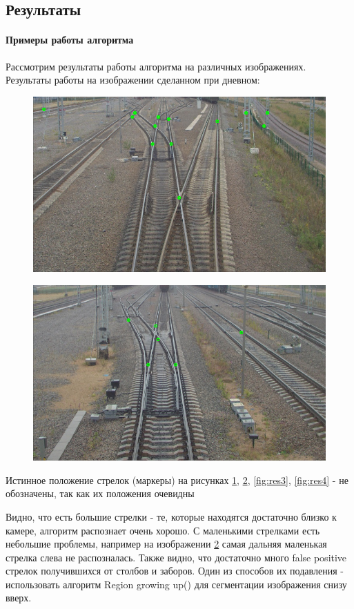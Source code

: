 \newpage
\subsection{Результаты}
\paragraph{Примеры работы алгоритма}
Рассмотрим результаты работы алгоритма на различных изображениях.
\newline
Результаты работы на изображении сделанном при дневном:
\begin{figure}[!h]
	\centering
	\includegraphics[width=0.7\linewidth]{pictures/screenshot0015}
	\caption{}
	\label{fig:res1}
\end{figure}
\begin{figure}[!h]
	\centering
	\includegraphics[width=0.7\linewidth]{pictures/screenshot0016}
	\caption{}
	\label{fig:res2}
\end{figure}
\newpage

Истинное положение стрелок (маркеры) на рисунках \ref{fig:res1}, \ref{fig:res2}, \ref{fig:res3}, \ref{fig:res4} - не обозначены, так как их положения очевидны

Видно, что есть большие стрелки - те, которые находятся достаточно близко к камере, алгоритм распознает очень хорошо. С маленькими стрелками есть небольшие проблемы, например на изображении \ref{fig:res2} самая дальняя маленькая стрелка слева не распозналась.\newline
Также видно, что достаточно много false positive стрелок получившихся от столбов и заборов. Один из способов их подавления - использовать алгоритм Region growing up(\cite{b:growing_up}) для сегментации изображения снизу вверх.

